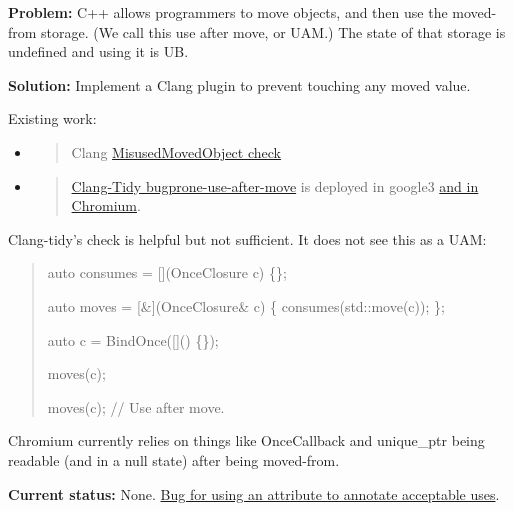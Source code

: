 \documentclass[a4paper,12pt,notitlepage,twoside,openright]{article}
\newcommand{\uline}[1]{#1}
\begin{document}
{\textbf{Problem:} C++ allows programmers to move objects, and then use
the moved-from storage. (We call this use after move, or UAM.) The state
of that storage is undefined and using it is UB.

\textbf{Solution:} Implement a Clang plugin to prevent touching any
moved value.

Existing work:

\begin{itemize}
\item
  \begin{quote}
  Clang \href{https://www.google.com/url?q=https://clang.llvm.org/docs/analyzer/checkers.html\%23alpha-cplusplus-misusedmovedobject-c\&sa=D\&source=editors\&ust=1631944129108000\&usg=AOvVaw0Z8KLx8foXb0CEYmjb384B}{\uline{MisusedMovedObject
  check}}
  \end{quote}
\item
  \begin{quote}
  \href{https://www.google.com/url?q=https://clang.llvm.org/extra/clang-tidy/checks/bugprone-use-after-move.html\&sa=D\&source=editors\&ust=1631944129108000\&usg=AOvVaw3euQN7cJIxz8XBVdcRGC3r}{\uline{Clang-Tidy
  bugprone-use-after-move}} is deployed in
  google3 \href{https://www.google.com/url?q=https://chromium-review.googlesource.com/c/chromium/src/\%2B/2383010\&sa=D\&source=editors\&ust=1631944129108000\&usg=AOvVaw0y_18KwSgPtPRNt-LsDNe_}{\uline{and
  in Chromium}}.
  \end{quote}
\end{itemize}

Clang-tidy's check is helpful but not sufficient. It does not see this
as a UAM:

\begin{quote}
auto consumes = {[}{]}(OnceClosure c) \{\};

auto moves = {[}\&{]}(OnceClosure\& c) \{ consumes(std::move(c)); \};

auto c = BindOnce({[}{]}() \{\});

moves(c);

moves(c); // Use after move.
\end{quote}

Chromium currently relies on things
like OnceCallback and unique\_ptr being readable (and in a null state)
after being moved-from.

\textbf{Current
status:} None. \href{https://www.google.com/url?q=https://crbug.com/1198689\&sa=D\&source=editors\&ust=1631944129110000\&usg=AOvVaw37710zVQHo5HvDBB4mW1Hy}{\uline{Bug
for using an attribute to annotate acceptable uses}}.

}
\end{document}
